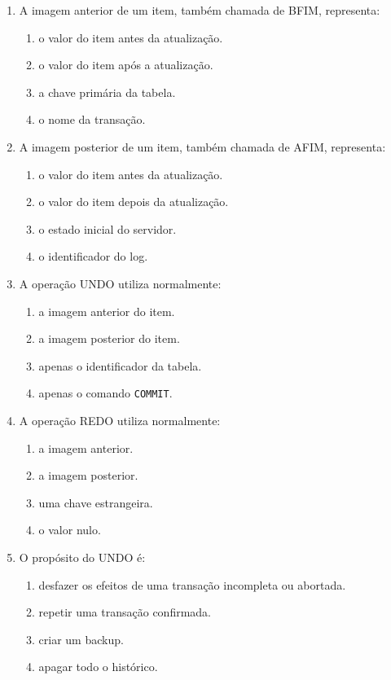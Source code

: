 \documentclass[12pt,a4paper]{article}
\begin{document}
\begin{enumerate}[label=\textbf{Q\arabic*.}]
\item A imagem anterior de um item, também chamada de BFIM, representa:

\begin{enumerate}[label=\alph*)]
    \item o valor do item antes da atualização.
    \item o valor do item após a atualização.
    \item a chave primária da tabela.
    \item o nome da transação.
\end{enumerate}

\item A imagem posterior de um item, também chamada de AFIM, representa:

\begin{enumerate}[label=\alph*)]
    \item o valor do item antes da atualização.
    \item o valor do item depois da atualização.
    \item o estado inicial do servidor.
    \item o identificador do log.
\end{enumerate}

\item A operação UNDO utiliza normalmente:

\begin{enumerate}[label=\alph*)]
    \item a imagem anterior do item.
    \item a imagem posterior do item.
    \item apenas o identificador da tabela.
    \item apenas o comando \texttt{COMMIT}.
\end{enumerate}

\item A operação REDO utiliza normalmente:

\begin{enumerate}[label=\alph*)]
    \item a imagem anterior.
    \item a imagem posterior.
    \item uma chave estrangeira.
    \item o valor nulo.
\end{enumerate}

\item O propósito do UNDO é:

\begin{enumerate}[label=\alph*)]
    \item desfazer os efeitos de uma transação incompleta ou abortada.
    \item repetir uma transação confirmada.
    \item criar um backup.
    \item apagar todo o histórico.
\end{enumerate}


\end{enumerate}
\end{document}
